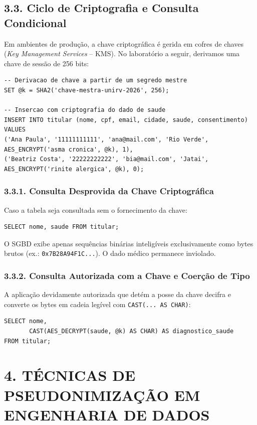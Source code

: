 \subsection*{3.3. Ciclo de Criptografia e Consulta Condicional}

Em ambientes de produção, a chave criptográfica é gerida em cofres de chaves (\textit{Key Management Services} -- KMS). No laboratório a seguir, derivamos uma chave de sessão de 256 bits:

\begin{lstlisting}
-- Derivacao de chave a partir de um segredo mestre
SET @k = SHA2('chave-mestra-unirv-2026', 256);

-- Insercao com criptografia do dado de saude
INSERT INTO titular (nome, cpf, email, cidade, saude, consentimento) VALUES
('Ana Paula', '11111111111', 'ana@mail.com', 'Rio Verde', AES_ENCRYPT('asma cronica', @k), 1),
('Beatriz Costa', '22222222222', 'bia@mail.com', 'Jatai', AES_ENCRYPT('rinite alergica', @k), 0);
\end{lstlisting}

\subsubsection*{3.3.1. Consulta Desprovida da Chave Criptográfica}

Caso a tabela seja consultada sem o fornecimento da chave:
\begin{lstlisting}
SELECT nome, saude FROM titular;
\end{lstlisting}
O SGBD exibe apenas sequências binárias inteligíveis exclusivamente como bytes brutos (ex.: \texttt{0x7B28A94F1C...}). O dado médico permanece inviolado.

\subsubsection*{3.3.2. Consulta Autorizada com a Chave e Coerção de Tipo}

A aplicação devidamente autorizada que detém a posse da chave decifra e converte os bytes em cadeia legível com \texttt{CAST(... AS CHAR)}:

\begin{lstlisting}
SELECT nome,
       CAST(AES_DECRYPT(saude, @k) AS CHAR) AS diagnostico_saude
FROM titular;
\end{lstlisting}

\newpage

\section*{4. TÉCNICAS DE PSEUDONIMIZAÇÃO EM ENGENHARIA DE DADOS}

